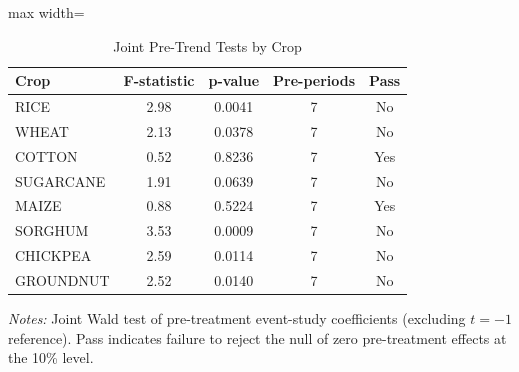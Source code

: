\begin{table}[!h]
\centering
\caption{\label{tab:pretrend}Joint Pre-Trend Tests by Crop}
\centering
\begin{adjustbox}{max width=\textwidth}
\begin{tabular}[t]{lcccc}
\toprule
Crop & F-statistic & p-value & Pre-periods & Pass\\
\midrule
RICE & 2.98 & 0.0041 & 7 & No\\
WHEAT & 2.13 & 0.0378 & 7 & No\\
COTTON & 0.52 & 0.8236 & 7 & Yes\\
SUGARCANE & 1.91 & 0.0639 & 7 & No\\
MAIZE & 0.88 & 0.5224 & 7 & Yes\\
\addlinespace
SORGHUM & 3.53 & 0.0009 & 7 & No\\
CHICKPEA & 2.59 & 0.0114 & 7 & No\\
GROUNDNUT & 2.52 & 0.0140 & 7 & No\\
\bottomrule
\end{tabular}
\end{adjustbox}

\par \raggedright \footnotesize
\textit{Notes:} Joint Wald test of pre-treatment event-study coefficients (excluding $t = -1$ reference). Pass indicates failure to reject the null of zero pre-treatment effects at the 10\% level.
\end{table}
